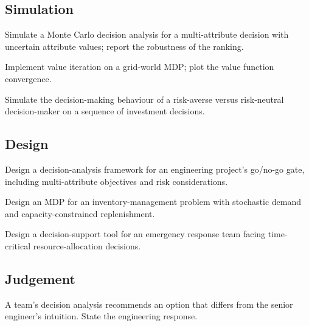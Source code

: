 \subsection*{Simulation}

\begin{exercise}
Simulate a Monte Carlo decision analysis for a multi-attribute decision with uncertain attribute values; report the robustness of the ranking.
\end{exercise}

\begin{exercise}
Implement value iteration on a grid-world MDP; plot the value function convergence.
\end{exercise}

\begin{exercise}
Simulate the decision-making behaviour of a risk-averse versus risk-neutral decision-maker on a sequence of investment decisions.
\end{exercise}

\subsection*{Design}

\begin{exercise}
Design a decision-analysis framework for an engineering project's go/no-go gate, including multi-attribute objectives and risk considerations.
\end{exercise}

\begin{exercise}
Design an MDP for an inventory-management problem with stochastic demand and capacity-constrained replenishment.
\end{exercise}

\begin{exercise}
Design a decision-support tool for an emergency response team facing time-critical resource-allocation decisions.
\end{exercise}

\subsection*{Judgement}

\begin{exercise}
A team's decision analysis recommends an option that differs from the senior engineer's intuition. State the engineering response.
\end{exercise}

